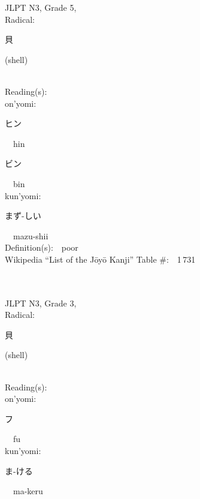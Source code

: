 \begin{multicols}{2}
{JLPT N3, Grade 5, \\Radical:\ \ {\begin{CJK}{UTF8}{min} 貝 \end{CJK}} (shell) } \\
Reading(s):\ \ \\
{\hspace*{1em}}on'yomi:\ \ \\
{\hspace*{2em}}{\begin{CJK}{UTF8}{min} ヒン \end{CJK}}\ \ hin\ \ \\
{\hspace*{2em}}{\begin{CJK}{UTF8}{min} ビン \end{CJK}}\ \ bin\ \ \\
{\hspace*{1em}}kun'yomi:\ \ \\
{\hspace*{2em}}{\begin{CJK}{UTF8}{min} まず-しい \end{CJK}}\ \ mazu-shii\ \ \\
Definition(s):\ \ poor \\
Wikipedia ``List of the J\=oy\=o Kanji'' Table \#:\ \ 1\,731 \\
\ \ \\
{\fontsize{34pt}{40pt}  }\ \ \\  %
{JLPT N3, Grade 3, \\Radical:\ \ {\begin{CJK}{UTF8}{min} 貝 \end{CJK}} (shell) } \\
Reading(s):\ \ \\
{\hspace*{1em}}on'yomi:\ \ \\
{\hspace*{2em}}{\begin{CJK}{UTF8}{min} フ \end{CJK}}\ \ fu\ \ \\
{\hspace*{1em}}kun'yomi:\ \ \\
{\hspace*{2em}}{\begin{CJK}{UTF8}{min} ま-ける \end{CJK}}\ \ ma-keru\ \ \\

\end{multicols}
